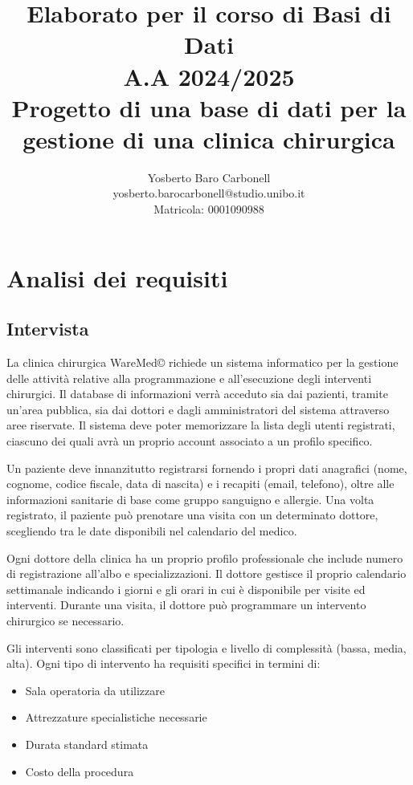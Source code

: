 \documentclass[12pt,a4paper]{report}
\title{{\Huge Elaborato per il corso di Basi di Dati}\\[1cm]
       {\Large A.A 2024/2025}\\[1cm]
       {\Large Progetto di una base di dati per la gestione di una clinica chirurgica}}
\author{Yosberto Baro Carbonell\\[0.5cm]
        yosberto.barocarbonell@studio.unibo.it\\
        Matricola: 0001090988
        }
\date{}
\begin{document}
\maketitle

\tableofcontents

\chapter{Analisi dei requisiti}

\section{Intervista}
La clinica chirurgica WareMed© richiede un sistema informatico per la gestione delle attività relative alla programmazione e all'esecuzione degli interventi chirurgici. Il database di informazioni verrà acceduto sia dai pazienti, tramite un'area pubblica, sia dai dottori e dagli amministratori del sistema attraverso aree riservate. Il sistema deve poter memorizzare la lista degli utenti registrati, ciascuno dei quali avrà un proprio account associato a un profilo specifico.

Un paziente deve innanzitutto registrarsi fornendo i propri dati anagrafici (nome, cognome, codice fiscale, data di nascita) e i recapiti (email, telefono), oltre alle informazioni sanitarie di base come gruppo sanguigno e allergie. Una volta registrato, il paziente può prenotare una visita con un determinato dottore, scegliendo tra le date disponibili nel calendario del medico.

Ogni dottore della clinica ha un proprio profilo professionale che include numero di registrazione all'albo e specializzazioni. Il dottore gestisce il proprio calendario settimanale indicando i giorni e gli orari in cui è disponibile per visite ed interventi. Durante una visita, il dottore può programmare un intervento chirurgico se necessario.

Gli interventi sono classificati per tipologia e livello di complessità (bassa, media, alta). Ogni tipo di intervento ha requisiti specifici in termini di:
\begin{itemize}
\item Sala operatoria da utilizzare
\item Attrezzature specialistiche necessarie
\item Durata standard stimata
\item Costo della procedura
\end{itemize}
\end{document}
